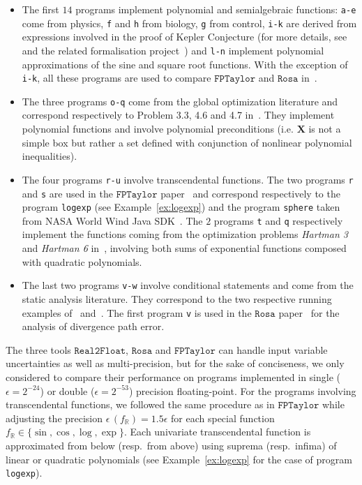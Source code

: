 \documentclass[preprint]{sigplanconf}
\newcommand{\code}[1]{\lstinline{#1}}
\newcommand{\R}{\mathbb{R}}
\def\X{\mathbf{X}}
\newcommand{\realtofloat}{\mathtt{Real2Float}}
\newcommand{\rosa}{\mathtt{Rosa}}
\newcommand{\fptaylor}{\mathtt{FPTaylor}}
\theoremstyle{plain}
\begin{document}
\begin{itemize}
\item The first $14$ programs implement polynomial and semialgebraic functions: \code{a-e} come from physics, \code{f} and \code{h} from biology, \code{g} from control, \code{i-k} are derived from expressions involved in the proof of Kepler Conjecture (for more details, see~\cite{halesalgo} and the related formalisation project~\cite{Flyspeck06}) and \code{l-n} implement polynomial approximations of the sine and square root functions. With the exception of \code{i-k}, all these programs are used to compare $\fptaylor$ and $\rosa$ in~\cite{fptaylor15}. 
\item The three programs \code{o-q} come from the global optimization literature and correspond respectively to Problem 3.3, 4.6 and 4.7 in~\cite{Floudas90}. They implement polynomial functions and involve polynomial preconditions (i.e. $\X$ is not a simple box but rather a set defined with conjunction of nonlinear polynomial inequalities).
\item The four programs \code{r-u} involve transcendental functions. The two programs \code{r} and \code{s} are used in the $\fptaylor$ paper~\cite{fptaylor15} and correspond respectively to the program \code{logexp} (see Example~\ref{ex:logexp}) and the program \code{sphere} taken from NASA World Wind Java SDK~\cite{NASA}. The $2$ programs \code{t} and \code{q} respectively implement the functions coming from the optimization problems \textit{Hartman 3} and \textit{Hartman 6} in~\cite{Ali05}, involving both sums of exponential functions composed with quadratic polynomials.
\item The last two programs \code{v-w} involve conditional statements and come from the static analysis literature. They correspond to the two respective running examples of~\cite{Zonotope10} and~\cite{Marechal14}. The first program \code{v} is used in the $\rosa$ paper~\cite{Darulova14Popl} for the analysis of divergence path error.
\end{itemize}
%
The three tools $\realtofloat$, $\rosa$ and $\fptaylor$ can handle input variable uncertainties as well as multi-precision, but for the sake of conciseness, we only considered to compare their performance on programs implemented in single ($\epsilon = 2^{-24}$) or double ($\epsilon = 2^{-53}$) precision floating-point.
For the programs involving transcendental functions, we followed the same procedure as in $\fptaylor$ while adjusting the precision $\epsilon \,  (f_{\R}) = 1.5 \epsilon$ for each special function $f_{\R} \in \{\sin, \cos, \log, \exp \}$. Each univariate transcendental function is approximated from below (resp.~from above) using suprema (resp.~infima) of linear or quadratic polynomials (see Example~\ref{ex:logexp} for the case of program \code{logexp}). 
%
\end{document}
